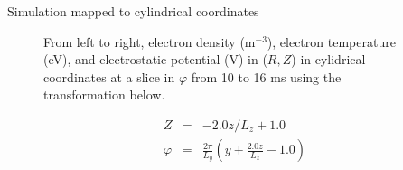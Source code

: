 \documentclass[12pt,table]{beamer}
\begin{document}
\begin{frame}{Simulation mapped to cylindrical coordinates}
\begin{minipage}{\linewidth}
\begin{figure}
    \centering
    \caption{From left to right, electron density (m$^{-3}$), electron temperature (eV), and electrostatic potential (V) in ($R,Z$) in cylidrical coordinates at a slice in $\varphi$ from 10 to 16 ms using the transformation below.}
\end{figure}%
\end{minipage} \footnotesize
\begin{eqnarray}
    \label{eq:flux-map1}
    Z &=& -2.0z/L_z + 1.0  \\ 
    \label{eq:flux-map2}
    \varphi &=& \frac{2\pi}{L_y}\left(y + \frac{2.0z}{L_z} - 1.0\right)
\end{eqnarray}
\end{frame}
\end{document}
